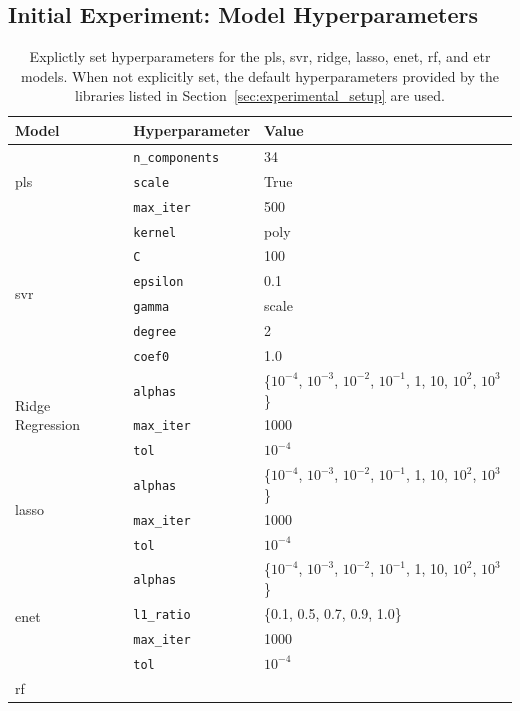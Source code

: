 \FloatBarrier

\subsection{Initial Experiment: Model Hyperparameters}\label{subsec:initial_experiment_hyperparameters}
\begin{table}[!htb]
\centering
\caption{Explictly set hyperparameters for the \gls{pls}, \gls{svr}, ridge, \gls{lasso}, \gls{enet}, \gls{rf}, and \gls{etr} models. When not explicitly set, the default hyperparameters provided by the libraries listed in Section~\ref{sec:experimental_setup} are used.}
\begin{tabular}{@{}llp{}@{}}
\toprule
\textbf{Model} & \textbf{Hyperparameter} & \textbf{Value} \\
\midrule
\multirow{3}{*}{\gls{pls}}
& \texttt{n\_components} & 34 \\
& \texttt{scale} & True \\
& \texttt{max\_iter} & 500 \\
\midrule
\multirow{6}{*}{\gls{svr}}
& \texttt{kernel} & poly \\
& \texttt{C} & 100 \\
& \texttt{epsilon} & 0.1 \\
& \texttt{gamma} & scale \\
& \texttt{degree} & 2 \\
& \texttt{coef0} & 1.0 \\
\midrule
\multirow{3}{*}{Ridge Regression}
& \texttt{alphas} & \{$10^{-4}$, $10^{-3}$, $10^{-2}$, $10^{-1}$, 1, 10, $10^2$, $10^3$\} \\
& \texttt{max\_iter} & 1000 \\
& \texttt{tol} & $10^{-4}$ \\
\midrule
\multirow{3}{*}{\gls{lasso}}
& \texttt{alphas} & \{$10^{-4}$, $10^{-3}$, $10^{-2}$, $10^{-1}$, 1, 10, $10^2$, $10^3$\} \\
& \texttt{max\_iter} & 1000 \\
& \texttt{tol} & $10^{-4}$ \\
\midrule
\multirow{4}{*}{\gls{enet}}
& \texttt{alphas} & \{$10^{-4}$, $10^{-3}$, $10^{-2}$, $10^{-1}$, 1, 10, $10^2$, $10^3$\} \\
& \texttt{l1\_ratio} & \{0.1, 0.5, 0.7, 0.9, 1.0\} \\
& \texttt{max\_iter} & 1000 \\
& \texttt{tol} & $10^{-4}$ \\
\midrule
\multirow{6}{*}{\gls{rf}}

\end{tabular}
\end{table}
